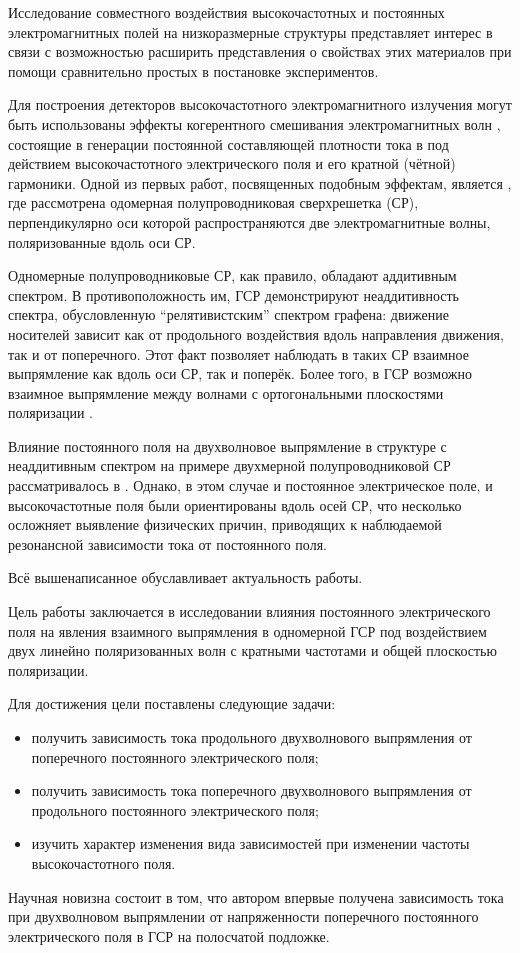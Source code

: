 Исследование совместного воздействия высокочастотных и постоянных электромагнитных полей на низкоразмерные структуры \cite{olbrich, hyart, neg-conductivity, mutual-rectification, liu, attaccalite, silveirinha}  представляет интерес в связи с возможностью расширить представления о свойствах этих материалов при помощи сравнительно простых в постановке экспериментов. 

Для построения детекторов высокочастотного электромагнитного излучения могут быть использованы эффекты когерентного смешивания электромагнитных волн \cite{mensah, hendry, kumar,two-axis-sl}, состоящие в генерации постоянной составляющей плотности тока в под действием высокочастотного электрического поля и его кратной (чётной) гармоники. Одной из первых работ, посвященных подобным эффектам, является \cite{mensah}, где рассмотрена одомерная полупроводниковая сверхрешетка (СР), перпендикулярно оси которой распространяются две электромагнитные волны, поляризованные вдоль оси СР.

Одномерные полупроводниковые СР, как правило, обладают аддитивным спектром. В противоположность им, ГСР демонстрируют неаддитивность спектра, обусловленную ``релятивистским'' спектром графена: движение носителей зависит как от продольного воздействия вдоль направления движения, так и от поперечного. Этот факт позволяет наблюдать в таких СР взаимное выпрямление как вдоль оси СР, так и поперёк. Более того, в ГСР возможно взаимное выпрямление между волнами с ортогональными плоскостями поляризации \cite{gsl-sio2-sic}.

Влияние постоянного поля на двухволновое выпрямление в структуре с неаддитивным спектром на примере двухмерной полупроводниковой СР рассматривалось в \cite{two-axis-sl}. Однако, в этом случае и постоянное электрическое поле, и высокочастотные поля были ориентированы вдоль осей СР, что несколько осложняет выявление физических причин, приводящих к наблюдаемой резонансной зависимости тока от постоянного поля.

Всё вышенаписанное обуславливает актуальность работы.

Цель работы заключается в исследовании влияния постоянного электрического поля на явления взаимного выпрямления в одномерной ГСР под воздействием двух линейно поляризованных волн с кратными частотами и общей плоскостью поляризации.

Для достижения цели поставлены следующие задачи:
\begin{itemize}
    \item получить зависимость тока продольного двухволнового выпрямления от поперечного постоянного электрического поля;
    \item получить зависимость тока поперечного двухволнового выпрямления от продольного постоянного электрического поля;
    \item изучить характер изменения вида зависимостей при изменении частоты высокочастотного поля.
\end{itemize}

Научная новизна состоит в том, что автором впервые получена зависимость тока при двухволновом выпрямлении от напряженности поперечного постоянного электрического поля в ГСР на полосчатой подложке.